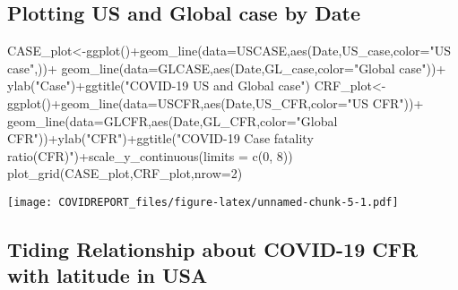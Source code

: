 \documentclass[
]{article}
\newenvironment{Shaded}{\begin{snugshade}}{\end{snugshade}}
\newcommand{\AttributeTok}[1]{\textcolor[rgb]{0.77,0.63,0.00}{#1}}
\newcommand{\DecValTok}[1]{\textcolor[rgb]{0.00,0.00,0.81}{#1}}
\newcommand{\FunctionTok}[1]{\textcolor[rgb]{0.00,0.00,0.00}{#1}}
\newcommand{\NormalTok}[1]{#1}
\newcommand{\OtherTok}[1]{\textcolor[rgb]{0.56,0.35,0.01}{#1}}
\newcommand{\SpecialCharTok}[1]{\textcolor[rgb]{0.00,0.00,0.00}{#1}}
\newcommand{\StringTok}[1]{\textcolor[rgb]{0.31,0.60,0.02}{#1}}
\begin{document}
\hypertarget{plotting-us-and-global-case-by-date}{%
\subsection{Plotting US and Global case by
Date}\label{plotting-us-and-global-case-by-date}}

\begin{Shaded}
\begin{Highlighting}[]
\NormalTok{CASE\_plot}\OtherTok{\textless{}{-}}\FunctionTok{ggplot}\NormalTok{()}\SpecialCharTok{+}\FunctionTok{geom\_line}\NormalTok{(}\AttributeTok{data=}\NormalTok{USCASE,}\FunctionTok{aes}\NormalTok{(Date,US\_case,}\AttributeTok{color=}\StringTok{"US case"}\NormalTok{,))}\SpecialCharTok{+}
  \FunctionTok{geom\_line}\NormalTok{(}\AttributeTok{data=}\NormalTok{GLCASE,}\FunctionTok{aes}\NormalTok{(Date,GL\_case,}\AttributeTok{color=}\StringTok{"Global case"}\NormalTok{))}\SpecialCharTok{+}
  \FunctionTok{ylab}\NormalTok{(}\StringTok{"Case"}\NormalTok{)}\SpecialCharTok{+}\FunctionTok{ggtitle}\NormalTok{(}\StringTok{"COVID{-}19 US and Global case"}\NormalTok{)}
\NormalTok{CRF\_plot}\OtherTok{\textless{}{-}}\FunctionTok{ggplot}\NormalTok{()}\SpecialCharTok{+}\FunctionTok{geom\_line}\NormalTok{(}\AttributeTok{data=}\NormalTok{USCFR,}\FunctionTok{aes}\NormalTok{(Date,US\_CFR,}\AttributeTok{color=}\StringTok{"US CFR"}\NormalTok{))}\SpecialCharTok{+}
  \FunctionTok{geom\_line}\NormalTok{(}\AttributeTok{data=}\NormalTok{GLCFR,}\FunctionTok{aes}\NormalTok{(Date,GL\_CFR,}\AttributeTok{color=}\StringTok{"Global CFR"}\NormalTok{))}\SpecialCharTok{+}\FunctionTok{ylab}\NormalTok{(}\StringTok{"CFR"}\NormalTok{)}\SpecialCharTok{+}\FunctionTok{ggtitle}\NormalTok{(}\StringTok{"COVID{-}19 Case fatality ratio(CFR)"}\NormalTok{)}\SpecialCharTok{+}\FunctionTok{scale\_y\_continuous}\NormalTok{(}\AttributeTok{limits =} \FunctionTok{c}\NormalTok{(}\DecValTok{0}\NormalTok{, }\DecValTok{8}\NormalTok{))}
\FunctionTok{plot\_grid}\NormalTok{(CASE\_plot,CRF\_plot,}\AttributeTok{nrow=}\DecValTok{2}\NormalTok{)}
\end{Highlighting}
\end{Shaded}

\texttt{[image: COVIDREPORT\_files/figure-latex/unnamed-chunk-5-1.pdf]}

\hypertarget{tiding-relationship-about-covid-19-cfr-with-latitude-in-usa}{%
\subsection{Tiding Relationship about COVID-19 CFR with latitude in
USA}\label{tiding-relationship-about-covid-19-cfr-with-latitude-in-usa}}
\end{document}
